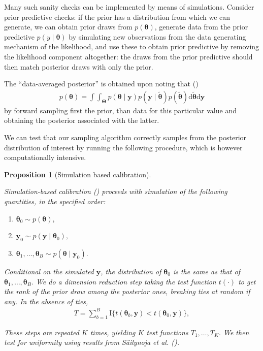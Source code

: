 \documentclass[
  11pt,
  letterpaper,
]{scrbook}
\providecommand{\tightlist}{%
  \setlength{\itemsep}{0pt}\setlength{\parskip}{0pt}}
\theoremstyle{definition}
\theoremstyle{plain}
\newtheorem{proposition}{Proposition}[chapter]
\theoremstyle{plain}
\theoremstyle{plain}
\theoremstyle{definition}
\theoremstyle{definition}
\theoremstyle{plain}
\newtheorem{proposition}{Proposition}[chapter]
\theoremstyle{plain}
\theoremstyle{remark}
\begin{document}
Many such sanity checks can be implemented by means of simulations.
Consider prior predictive checks: if the prior has a distribution from
which we can generate, we can obtain prior draws from
\(p(\boldsymbol{\theta})\), generate data from the prior predictive
\(p(y \mid \boldsymbol{\theta})\) by simulating new observations from
the data generating mechanism of the likelihood, and use these to obtain
prior predictive by removing the likelihood component altogether: the
draws from the prior predictive should then match posterior draws with
only the prior.

The ``data-averaged posterior'' is obtained upon noting that
() \begin{align*}
p(\boldsymbol{\theta}) = \int \int_{\boldsymbol{\Theta}} p( \boldsymbol{\theta} \mid \boldsymbol{y}) p(\boldsymbol{y} \mid \widetilde{\boldsymbol{\theta}}) p(\widetilde{\boldsymbol{\theta}}) \mathrm{d} \widetilde{\boldsymbol{\theta}} \mathrm{d} \boldsymbol{y}
\end{align*} by forward sampling first the prior, than data for this
particular value and obtaining the posterior associated with the latter.

We can test that our sampling algorithm correctly samples from the
posterior distribution of interest by running the following procedure,
which is however computationally intensive.

\begin{proposition}[Simulation based
calibration]\protect\hypertarget{prp-sbc}{}\label{prp-sbc}

Simulation-based calibration () proceeds with simulation of the following quantities, in the
specified order:

\begin{enumerate}
\def\labelenumi{\arabic{enumi}.}
\tightlist
\item
  \(\boldsymbol{\theta}_0 \sim p(\boldsymbol{\theta}),\)
\item
  \(\boldsymbol{y}_0 \sim p(\boldsymbol{y} \mid \boldsymbol{\theta}_0),\)
\item
  \(\boldsymbol{\theta}_1, \ldots, \boldsymbol{\theta}_B \sim p(\boldsymbol{\theta} \mid \boldsymbol{y}_0 ).\)
\end{enumerate}

Conditional on the simulated \(\boldsymbol{y}\), the distribution of
\(\boldsymbol{\theta}_0\) is the same as that of
\(\boldsymbol{\theta}_1, \ldots, \boldsymbol{\theta}_B.\) We do a
dimension reduction step taking the test function \(t(\cdot)\) to get
the rank of the prior draw among the posterior ones, breaking ties at
random if any. In the absence of ties, \begin{align*}
T = \sum_{b=1}^B \mathrm{I}\{t(\boldsymbol{\theta}_b, \boldsymbol{y}) < t(\boldsymbol{\theta}_0,\boldsymbol{y})\},
\end{align*}

These steps are repeated \(K\) times, yielding \(K\) test functions
\(T_1, \ldots, T_K.\) We then test for uniformity using results from
Säilynoja et al. ().

\end{proposition}
\end{document}

